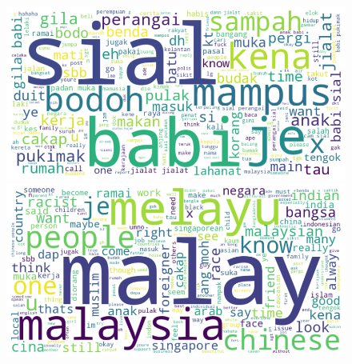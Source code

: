 \documentclass[preprint]{article}
\begin{document}
\begin{figure}[h]
  \centering
  \begin{minipage}[b]{0.45\textwidth}
    \centering
    \includegraphics[width=\linewidth]{img/harassment-wordcloud.png}
  \end{minipage}
  \hfill
  \begin{minipage}[b]{0.45\textwidth}
    \centering
    \includegraphics[width=\linewidth]{img/racist-wordcloud.png}
  \end{minipage}
\end{figure}
\end{document}
